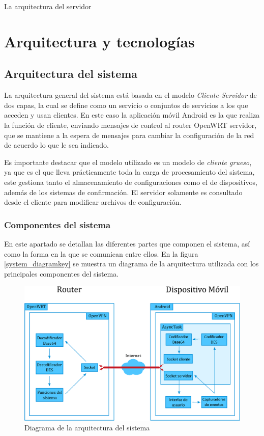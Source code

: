 \documentclass[12pt]{article}
\begin{document}
        La arquitectura del servidor 

\section{Arquitectura y tecnologías}

    \subsection{Arquitectura del sistema}

        La arquitectura general del sistema está basada en el modelo \textit{Cliente-Servidor} de dos capas, la cual se define como un servicio o conjuntos de servicios a los que acceden y usan clientes. En este caso la aplicación móvil Android es la que realiza la función de cliente, enviando mensajes de control al router OpenWRT servidor, que se mantiene a la espera de mensajes para cambiar la configuración de la red de acuerdo lo que le sea indicado.

        Es importante destacar que el modelo utilizado es un modelo de \textit{cliente grueso}, ya que es el que lleva prácticamente toda la carga de procesamiento del sistema, este gestiona tanto el almacenamiento de configuraciones como el de dispositivos, además de los sistemas de confirmación. El servidor solamente es consultado desde el cliente para modificar archivos de configuración.

        \subsubsection{Componentes del sistema}
            En este apartado se detallan las diferentes partes que componen el sistema, así como la forma en la que se comunican entre ellos. En la figura \ref{system_diagramkey} se muestra un diagrama de la arquitectura utilizada con los principales componentes del sistema.

            \begin{figure}[h!]
            \centering
                \includegraphics[scale=0.5]{system_diagram.eps}
                \caption{Diagrama de la arquitectura del sistema}
                \label{fig:system_diagram}
            \end{figure}
\end{document}
